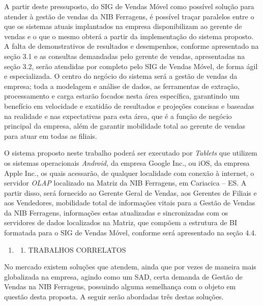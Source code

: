 \documentclass[a4paper]{article}
\newcounter{saveenum}
\newcommand\liststyleWWviiiNumi{%
\renewcommand\theenumi{\arabic{enumi}}
\renewcommand\theenumii{\arabic{enumi}.\arabic{enumii}}
\renewcommand\theenumiii{\arabic{enumi}.\arabic{enumii}.\arabic{enumiii}}
\renewcommand\theenumiv{\arabic{enumi}.\arabic{enumii}.\arabic{enumiii}.\arabic{enumiv}}
\renewcommand\labelenumi{\theenumi}
\renewcommand\labelenumii{\theenumii}
\renewcommand\labelenumiii{\theenumiii}
\renewcommand\labelenumiv{\theenumiv.}
}
\begin{document}
{
\textsf{A partir deste pressuposto, do SIG de Vendas M\'ovel como poss\'ivel solu\c{c}\~ao para atender \`a gest\~ao de
vendas da NIB Ferragens, \'e poss\'ivel tra\c{c}ar paralelos entre o que os sistemas atuais implantados na empresa
disponibilizam ao gerente de vendas e o que o mesmo obter\'a a partir da implementa\c{c}\~ao do sistema proposto. A
falta de demonstrativos de resultados e desempenhos, conforme apresentado na se\c{c}\~ao 3.1 e as consultas demandadas
pelo gerente de vendas, apresentadas na se\c{c}\~ao 3.2, ser\~ao atendidas por completo pelo SIG de Vendas M\'ovel, de
forma \'agil e especializada. O centro do neg\'ocio do sistema ser\'a a gest\~ao de vendas da empresa; toda a modelagem
e an\'alise de dados, as ferramentas de extra\c{c}\~ao, processamento e carga estar\~ao focados nesta \'area
espec\'ifica, garantindo um benef\'icio em velocidade e exatid\~ao de resultados e proje\c{c}\~oes concisas e baseadas
na realidade e nas expectativas para esta \'area, que \'e a fun\c{c}\~ao de neg\'ocio principal da empresa, al\'em de
garantir mobilidade total ao gerente de vendas para atuar em todas as filiais. }}

{
\textsf{O sistema proposto neste trabalho poder\'a ser executado por }\textsf{\textit{Tablets}}\textsf{ que utilizem os
sistemas operacionais }\textsf{\textit{Android, }}\textsf{da empresa Google Inc., ou iOS, da empresa Apple Inc., os
quais acessar\~ao, de qualquer localidade com conex\~ao \`a internet, o servidor }\textsf{\textit{OLAP}}\textsf{
localizado na Matriz da NIB Ferragens, em Cariacica -- ES. A partir disso, ser\'a fornecido ao Gerente Geral de Vendas,
aos Gerentes de Filiais e aos Vendedores, mobilidade total de informa\c{c}\~oes vitais para a Gest\~ao de Vendas da NIB
Ferragens, informa\c{c}\~oes estas atualizadas e sincronizadas com os servidores de dados localizados na Matriz, que
comp\~oem a estrutura de BI formatada para o SIG de Vendas M\'ovel, conforme ser\'a apresentado na se\c{c}\~ao 4.4.}}


\bigskip

\liststyleWWviiiNumi
\setcounter{saveenum}{\value{enumi}}
\begin{enumerate}
\setcounter{enumi}{\value{saveenum}}
\item \setcounter{saveenum}{\value{enumii}}
\begin{enumerate}
\setcounter{enumii}{\value{saveenum}}
\item {\sffamily
TRABALHOS CORRELATOS}
\end{enumerate}
\end{enumerate}
{
\textsf{No mercado existem solu\c{c}\~oes que atendem, ainda que por vezes de maneira mais globalizada na empresa,
agindo como um SAD, certa demanda de Gest\~ao de Vendas na NIB Ferragens, possuindo alguma semelhan\c{c}a com o objeto
em quest\~ao desta proposta. A seguir ser\~ao abordadas tr\^es destas solu\c{c}\~oes.}}
\end{document}
